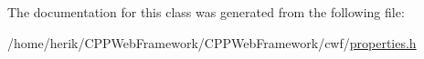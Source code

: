 The documentation for this class was generated from the following file\+:\begin{DoxyCompactItemize}
\item 
/home/herik/\+C\+P\+P\+Web\+Framework/\+C\+P\+P\+Web\+Framework/cwf/\hyperlink{properties_8h}{properties.\+h}\end{DoxyCompactItemize}
